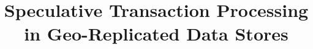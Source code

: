 \documentclass[preprint]{sigplanconf-eurosys}
\begin{document}
\newcommand\VRule[1][\arrayrulewidth]{\vrule width #1}
\newcommand{\specula}{STR\xspace}

\title{Speculative Transaction Processing in Geo-Replicated Data Stores}





\maketitle
\end{document}
